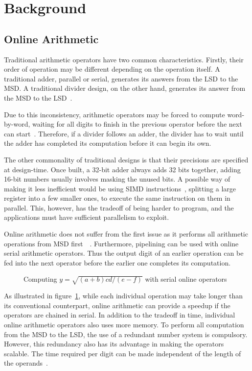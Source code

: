 \section{Background}

\subsection{Online Arithmetic}
Traditional arithmetic operators have two common characteristics.
Firstly, their order of operation may be different depending on the operation
itself.
A traditional adder, parallel or serial, generates its answers from the LSD to
the MSD.
A traditional divider design, on the other hand, generates its answer from
the MSD to the LSD~\cite{Brent1}\cite{Srinivas1}.

Due to this inconsistency, arithmetic operators may be forced to compute
word-by-word, waiting for all digits to finish in the previous operator before
the next can start~\cite{Zhao1}.
Therefore, if a divider follows an adder, the divider has to wait until the
adder has completed its computation before it can begin its own.

The other commonality of traditional designs is that their precisions are
specified at design-time.
Once built, a 32-bit adder always adds 32 bits together, adding 16-bit numbers
usually involves masking the unused bits.
A possible way of making it less inefficient would be using SIMD
instructions~\cite{Duncan1}, splitting a large register into a few smaller ones,
to execute the same instruction on them in parallel.
This, however, has the tradeoff of being harder to program, and the applications
must have sufficient parallelism to exploit.

Online arithmetic does not suffer from the first issue as it performs all
arithmetic operations from MSD first~\cite{Ercegovac1}~\cite{Ercegovac2}.
Furthermore, pipelining can be used with online serial arithmetic operators.
Thus the output digit of an earlier operation can be fed into the next
operator before the earlier one completes its computation.

\begin{figure}[H]
  \centering
  
  \caption{Computing $y=\sqrt{(a+b)cd/(e-f)}$ with serial online
           operators~\cite{Ercegovac1}}
  \label{Online}
\end{figure}

As illustrated in figure~\ref{Online}, while each individual operation may
take longer than its conventional counterpart, online arithmetic can provide
a speedup if the operators are chained in serial.
In addition to the tradeoff in time, individual online arithmetic operators
also uses more memory.
To perform all computation from the MSD to the LSD, the use of a
redundant number system is compulsory.
However, this redundancy also has its advantage in making the operators
scalable.
The time required per digit can be made independent of the length of the
operands~\cite{Trivedi1}.

